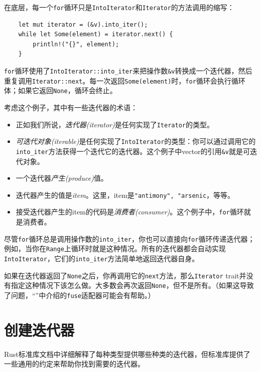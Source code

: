 在底层，每一个\texttt{for}循环只是\texttt{IntoIterator}和\texttt{Iterator}的方法调用的缩写：
\begin{verbatim}
    let mut iterator = (&v).into_iter();
    while let Some(element) = iterator.next() {
        println!("{}", element);
    }
\end{verbatim}

\texttt{for}循环使用了\texttt{IntoIterator::into\_iter}来把操作数\texttt{\&v}转换成一个迭代器，然后重复调用\texttt{Iterator::next}。每一次返回\texttt{Some(element)}时，\texttt{for}循环会执行循环体；如果它返回\texttt{None}，循环会终止。

考虑这个例子，其中有一些迭代器的术语：
\begin{itemize}
    \item 正如我们所说，\emph{迭代器(iterator)}是任何实现了\texttt{Iterator}的类型。
    \item \emph{可迭代对象(iterable)}是任何实现了\texttt{IntoIterator}的类型：你可以通过调用它的\texttt{into\_iter}方法获得一个迭代它的迭代器。这个例子中vector的引用\texttt{\&v}就是可迭代对象。
    \item 一个迭代器\emph{产生(produce)}值。
    \item 迭代器产生的值是\emph{item}。这里，item是\texttt{"antimony", "arsenic}，等等。
    \item 接受迭代器产生的item的代码是\emph{消费者(consumer)}。这个例子中，\texttt{for}循环就是消费者。
\end{itemize}

尽管\texttt{for}循环总是调用操作数的\texttt{into\_iter}，你也可以直接向\texttt{for}循环传递迭代器；例如，当你在\texttt{Range}上循环时就是这种情况。所有的迭代器都会自动实现\texttt{IntoIterator}，它们的\texttt{into\_iter}方法简单地返回迭代器自身。

如果在迭代器返回了\texttt{None}之后，你再调用它的\texttt{next}方法，那么\texttt{Iterator} trait并没有指定这种情况下该怎么做。大多数会再次返回\texttt{None}，但不是所有。（如果这导致了问题，“”中介绍的\texttt{fuse}适配器可能会有帮助。）

\section{创建迭代器}
Rust标准库文档中详细解释了每种类型提供哪些种类的迭代器，但标准库提供了一些通用的约定来帮助你找到需要的迭代器。

